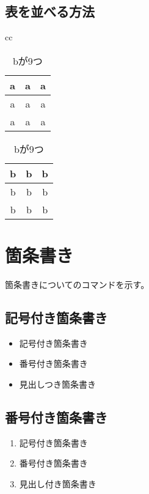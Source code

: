 \documentclass[11pt, oneside]{article}   	%
\begin{document}
\newpage
\subsection{表を並べる方法}
\begin{table}[htbp]
\begin{center}
\begin{tabular}{cc}
\begin{minipage}{0.3\hsize}
\begin{center}
\begin{tabular}{|c|c|c|}
\hline
a & a & a \\ \hline
a & a & a \\ \hline
a & a & a \\
\hline
\end{tabular}
\caption{aが9つ}
\end{center}
\end{minipage}

\begin{minipage}{0.3\hsize}
\begin{center}
\begin{tabular}{|c|c|c|}
\hline
b & b & b \\ \hline
b & b & b \\ \hline
b & b & b \\
\hline
\end{tabular}
\caption{bが9つ}
\end{center}
\end{minipage}
\end{tabular}
\end{center}
\end{table}

\section{箇条書き}
箇条書きについてのコマンドを示す。
\subsection{記号付き箇条書き}
\begin{itemize}
\item 記号付き箇条書き
\item 番号付き箇条書き
\item 見出しつき箇条書き
\end{itemize}

\subsection{番号付き箇条書き}
\begin{enumerate}
\item  記号付き箇条書き
\item 番号付き箇条書き
\item 見出し付き箇条書き
\end{enumerate}
\end{document}
